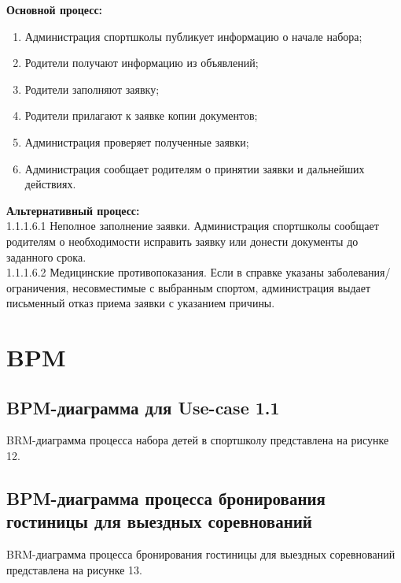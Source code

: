 \documentclass[12pt,a4paper,final]{article} %
\begin{document}
\par \textbf{Основной процесс:}
\begin{enumerate}[nosep, label=1.1.1.\arabic*]
	\item Администрация спортшколы публикует информацию о начале набора;
	\item Родители получают информацию из объявлений;
	\item Родители заполняют заявку;
	\item Родители прилагают к заявке копии документов;
	\item Администрация проверяет полученные заявки;
	\item Администрация сообщает родителям о принятии заявки и дальнейших действиях. 
\end{enumerate}

\par \textbf{Альтернативный процесс:} \\
1.1.1.6.1 Неполное заполнение заявки. Администрация спортшколы сообщает родителям о необходимости исправить заявку или донести документы до заданного срока. \\
1.1.1.6.2 Медицинские противопоказания. Если в справке указаны заболевания/ограничения, несовместимые с выбранным спортом, администрация выдает письменный отказ приема заявки с указанием причины.

\newpage
\section{BPM}
\subsection{BPM-диаграмма для Use-case 1.1}
\par BRM-диаграмма процесса набора детей в спортшколу представлена на рисунке 12.

\subsection{BPM-диаграмма процесса бронирования гостиницы для выездных соревнований}
\par BRM-диаграмма процесса бронирования гостиницы для выездных соревнований представлена на рисунке 13.

\newpage
 

\newpage
 
\setcounter{figure}{13}
\end{document}
